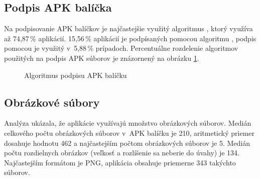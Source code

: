 \subsection{Podpis APK balíčka}
Na podpisovanie APK balíčkov je najčastejšie využitý algoritmus , ktorý využíva až 74,87\,\% aplikácií. 15,56\,\% aplikácií je podpísaných pomocou algoritmu , podpis pomocou  je využitý v~5,88\,\% prípadoch. Percentuálne rozdelenie algoritmov použitých na podpis APK súborov je znázornený na obrázku \ref{fig:signAlg}.


\begin{figure}[htb]
\centering
{}
\caption{Algoritmus podpisu APK balíčku}
\label{fig:signAlg}
\end{figure}

\subsection{Obrázkové súbory}
Analýza ukázala, že aplikácie využívajú množstvo obrázkových súborov. Medián celkového počtu obrázkových súborov v~APK balíčku je 210, aritmetický priemer dosahuje hodnotu 462 a najčastejším počtom obrázkových súborov je 5. Medián počtu rozdielnych obrázkov (veľkosť a rozlíšenie sa neberie do úvahy) je 134. Najčastejším formátom je PNG, aplikácia obsahuje priemerne 343 takýchto súborov.

